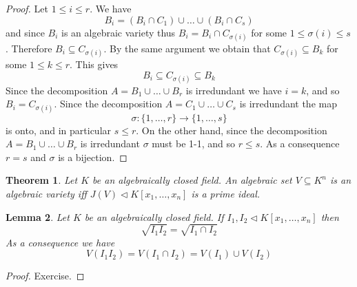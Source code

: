 \documentclass[12pt, letterpaper, oneside]{article}
\theoremstyle{plain}
\newtheorem{theorem}{Theorem}[section]
\newtheorem{lemma}[theorem]{Lemma}
\theoremstyle{definition}
\newcommand{\vs}{\vskip 5mm}
\begin{document}
\vs

\begin{proof}
Let $1\leq i\leq r$.  We have 
$$B_{i} = (B_{i}\cap C_{1})\cup \dots \cup (B_{i}\cap C_{s})$$
and since $B_{i}$ is an algebraic variety  thus 
$B_{i} = B_{i}\cap C_{\sigma(i)}$ for some $1\leq \sigma(i)\leq s$. 
Therefore $B_{i} \subseteq C_{\sigma(i)}$. By the same argument we obtain that 
$C_{\sigma(i)}\subseteq B_{k}$ for some $1\leq k\leq r$. This gives 
$$B_{i}\subseteq C_{\sigma(i)} \subseteq B_{k}$$
Since the decomposition $A= B_{1}\cup \dots \cup B_{r}$ is irredundant  we have  $i=k$, 
and so $B_{i} = C_{\sigma(i)}$. Since the decomposition 
$A = C_{1}\cup \dots \cup C_{s}$ is irredundant the map 
$$\sigma \colon \{1, \dots , r\} \to \{1, \dots , s\}$$
is onto, and in particular $s\leq r$. On the other hand, since the decomposition 
$A= B_{1}\cup \dots \cup B_{r}$ is irredundant  $\sigma $ must be 1-1, and so $r\leq s$. 
As a consequence $r=s$ and $\sigma$ is a bijection. 
\end{proof}

\vs\vs

\begin{theorem}
\label{THM_IRREDALGSETPRIMEID}
Let $K$ be an algebraically closed field.  An algebraic 
set $V\subseteq K^{n}$ is an algebraic variety  iff $J(V)\lhd K[x_{1}, \dots, x_{n}]$ is a prime ideal. 
\end{theorem}

\vs\vs

\begin{lemma}
\label{LEMMA_PRODRADISINTERSRAD}
Let $K$ be an algebraically closed field. If  $I_{1}, I_{2} \lhd K[x_{1}, \dots, x_{n}]$ then  
$$\sqrt{I_{1}I_{2}} = \sqrt{I_{1}\cap I_{2}}$$
As a consequence we have 
$$V(I_{1}I_{2}) = V(I_{1}\cap I_{2}) = V(I_{1}) \cup V(I_{2})$$
\end{lemma}


\vs 

\begin{proof}
Exercise. 
\end{proof}


\vs\vs
\end{document}
